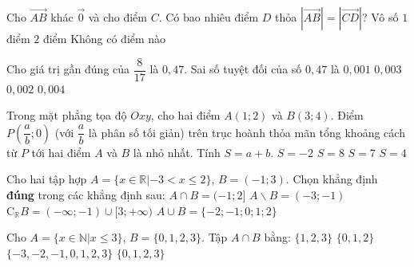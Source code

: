 \begin{ex}%
	Cho $\overrightarrow{AB}$ khác $\vec{0}$ và cho điểm $C$. Có bao nhiêu điểm $D$ thỏa $\left|\overrightarrow{AB}\right|=\left|\overrightarrow{CD}\right|$?
	\choice
	{\True Vô số}
	{$1$ điểm}
	{$2$ điểm}
	{Không có điểm nào}
\end{ex}
\begin{ex}%
	Cho giá trị gần đúng của $\dfrac{8}{17}$ là $0,47$. Sai số tuyệt đối của số $0,47$ là
	\choice
	{\True $0,001$}
	{$0,003$}
	{$0,002$}
	{$0,004$}
\end{ex} 
\begin{ex}%
	Trong mặt phẳng tọa độ $Oxy$, cho hai điểm $A(1;2)$ và $B(3;4)$. Điểm $P\left(\dfrac{a}{b};0\right)$ (với $\dfrac{a}{b}$ là phân số tối giản) trên trục hoành thỏa mãn tổng khoảng cách từ $P$ tới hai điểm $A$ và $B$ là nhỏ nhất. Tính $S=a+b$.
	\choice
	{$S=-2$}
	{\True $S=8$}
	{$S=7$}
	{$S=4$}
\end{ex}
\begin{ex}%
	Cho hai tập hợp $A=\{x\in \mathbb{R}|-3<x\le 2\}$, $B=(-1;3)$. Chọn khẳng định \textbf{đúng} trong các khẳng định sau:
	\choice
	{\True $A\cap B=(-1;2]$}
	{$A\backslash B=(-3;-1)$}
	{$\mathrm{C}_{\mathbb{R}} B=(-\infty;-1)\cup [3;+\infty)$}
	{$A\cup B=\{-2;-1;0;1;2  \}$}
	\loigiai{
		Ta có $A=(-3;2]$ nên $A\cap B=(-1;2]$.
	}
\end{ex}
\begin{ex}%
	Cho $A=\{x \in \mathbb{N}| x\le 3  \}$, $B=\{0,1,2,3  \}$. Tập $A\cap B$ bằng:
	\choice
	{$\{1,2,3  \}$}
	{$\{0,1,2 \}$}
	{$\{-3,-2,-1,0,1,2,3  \}$}
	{\True $\{0,1,2,3 \}$}
\end{ex}
